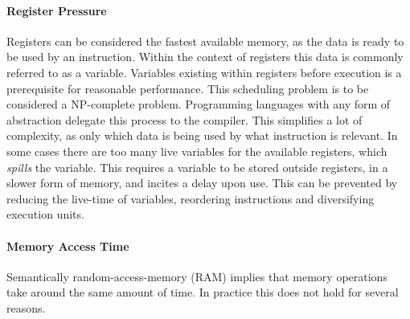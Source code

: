 \documentclass{article}
\begin{document}
\newpage

\paragraph{Register Pressure} 

Registers can be considered the fastest available memory, as the data is ready to be used by an instruction.
Within the context of registers this data is commonly referred to as a variable.
Variables existing within registers before execution is a prerequisite for reasonable performance.
This scheduling problem is to be considered a NP-complete problem\cite{register-allocation}.
Programming languages with any form of abstraction delegate this process to the compiler.
This simplifies a lot of complexity, as only which data is being used by what instruction is relevant.
In some cases there are too many live variables for the available registers, which {\it spills} the variable.
This requires a variable to be stored outside registers, in a slower form of memory, and incites a delay upon use.
This can be prevented by reducing the live-time of variables, reordering instructions and diversifying execution units.  

\paragraph{Memory Access Time}

Semantically random-access-memory (RAM) implies that memory operations take around the same amount of time.
In practice this does not hold for several reasons.
\end{document}
